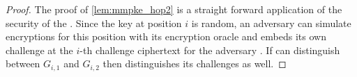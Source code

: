 \begin{proof}
  The proof of \cref{lem:mmpke_hop2} is a straight forward application of the \indrcca security of the \dem. Since the
  key at position $i$ is random, an \indrcca adversary can simulate encryptions for this position with its encryption
  oracle and embeds its own challenge at the $i$-th challenge ciphertext for the adversary \Adv. If \Adv can distinguish
  between $G_{i,1}$ and $G_{i,2}$ then \Bdv[2] distinguishes its challenges as well.
\end{proof}







